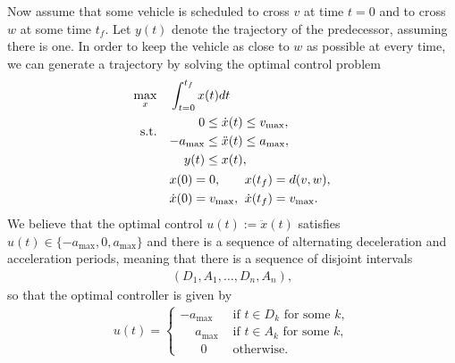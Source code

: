 \documentclass[a4paper]{article}
\theoremstyle{definition}
\theoremstyle{plain}
\begin{document}
Now assume that some vehicle is scheduled to cross $v$ at time $t=0$ and to
cross $w$ at some time $t_{f}$. Let $y(t)$ denote the trajectory of the
predecessor, assuming there is one. In order to keep the vehicle as close to $w$
as possible at every time, we can generate a trajectory by solving the optimal
control problem
\begin{equation}
  \label{eq:optimal_control}
  \begin{aligned}
  \max_{x}    \quad & \int_{t=0}^{t_{f}} x(t) dt \\
  \begin{alignedat}{2}\text{s.t.}\\ {}\end{alignedat} \quad &\begin{alignedat}{2}
                     0 \leq \; &\dot{x}(t) \leq v_{\max} , \\
                     {-a_{\max}} \leq \; &\ddot{x}(t) \leq a_{\max} , \\
                    y(t) \leq \; & x(t) , \\
                    \end{alignedat} \\
                    &\begin{alignedat}[t]{2}
                    & x(0) = 0 , &&  x(t_{f}) = d(v,w) , \\
                    & \dot{x}(0) = v_{\max} , \;\; && \dot{x}(t_{f}) = v_{\max} .
                    \end{alignedat}
  \end{aligned}
\end{equation}
%
We believe that the optimal control $u(t) := \ddot{x}(t)$ satisfies
$u(t) \in \{-a_{\max}, 0, a_{\max}\}$ and there is a sequence of alternating
deceleration and acceleration periods, meaning that there is a sequence of
disjoint intervals
\begin{align*}
  (D_{1}, A_{1}, \dots, D_{n}, A_{n}) ,
\end{align*}
so that the optimal controller is given by
\begin{align*}
  u(t) = \begin{cases}
           {-a_{\max}} &\text{ if } t \in D_{k} \text{ for some } k , \\
           \phantom{-} a_{\max}   &\text{ if } t \in A_{k} \text{ for some } k , \\
           \phantom{-} \;\, 0 &\text{ otherwise. }
         \end{cases}
\end{align*}
\end{document}
